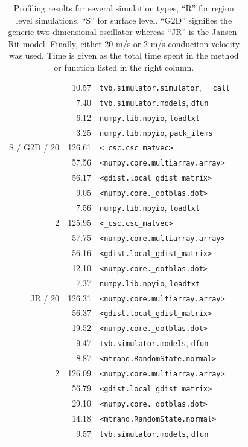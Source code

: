 \documentclass{bioinfo}
\begin{document}
\begin{table}
{\begin{tabular}{r | r | l }
		&         10.57& \texttt{tvb.simulator.simulator}, \texttt{\_\_call\_\_} \\
		 &         7.40& \texttt{tvb.simulator.models}, \texttt{dfun} \\
		 &         6.12& \texttt{numpy.lib.npyio}, \texttt{loadtxt} \\
		 &         3.25& \texttt{numpy.lib.npyio}, \texttt{pack\_items} \\
		\hline
		S / G2D / 20 &         126.61& \texttt{<\_csc.csc\_matvec>} \\
		&         57.56& \texttt{<numpy.core.multiarray.array>} \\
		 &         56.17& \texttt{<gdist.local\_gdist\_matrix>} \\
		 &           9.05& \texttt{<numpy.core.\_dotblas.dot>} \\
		 &         7.56& \texttt{numpy.lib.npyio}, \texttt{loadtxt} \\
		\hline
		2 &         125.95& \texttt{<\_csc.csc\_matvec>} \\
		&         57.75& \texttt{<numpy.core.multiarray.array>} \\
		 &         56.16& \texttt{<gdist.local\_gdist\_matrix>} \\
		 &         12.10& \texttt{<numpy.core.\_dotblas.dot>} \\
		 &         7.37& \texttt{numpy.lib.npyio}, \texttt{loadtxt} \\
		\hline
		JR / 20 &         126.31& \texttt{<numpy.core.multiarray.array>} \\
		&         56.37& \texttt{<gdist.local\_gdist\_matrix>} \\
		 &         19.52& \texttt{<numpy.core.\_dotblas.dot>} \\
		 &         9.47& \texttt{tvb.simulator.models}, \texttt{dfun} \\
		 &         8.87& \texttt{<mtrand.RandomState.normal>} \\
		\hline
		2 &         126.09& \texttt{<numpy.core.multiarray.array>} \\
		&         56.79& \texttt{<gdist.local\_gdist\_matrix>} \\
		 &          29.10& \texttt{<numpy.core.\_dotblas.dot>} \\
		 &         14.18& \texttt{<mtrand.RandomState.normal>} \\
		 &         9.57& \texttt{tvb.simulator.models}, \texttt{dfun} \\
		\hline

		\end{tabular}}
		\caption{Profiling results for several simulation types, ``R'' for region 
		level simulations, ``S'' for surface level. ``G2D'' signifies the generic
		two-dimensional oscillator whereas ``JR'' is the Jansen-Rit model. Finally,
		either 20 m/s or 2 m/s conduciton velocity was used. Time is given as the
		total time spent in the method or function listed in the right column.}
		\label{tab:profiling}
		\end{table}
\end{document}
